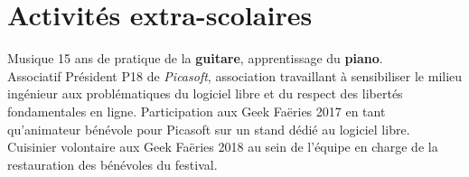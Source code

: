 \documentclass[letterpaper]{twentysecondcv} %
\begin{document}
\section{Activités extra-scolaires}
\begin{twenty}
	\twentyitem
    	{}
		{}
        {Musique}
        {}
        {}
        {15 ans de pratique de la \textbf{guitare}, apprentissage du \textbf{piano}.}
    \\
    \twentyitem
    	{}
		{}
        {Associatif}
        {}
        {}
        {Président P18 de \textit{Picasoft}, association travaillant à sensibiliser le milieu ingénieur aux problématiques du logiciel libre et du respect des libertés fondamentales en ligne. Participation aux Geek Faëries 2017 en tant qu'animateur bénévole pour Picasoft sur un stand dédié au logiciel libre.\\Cuisinier volontaire aux Geek Faëries 2018 au sein de l'équipe en charge de la restauration des bénévoles du festival.}
\end{twenty}
\end{document}
